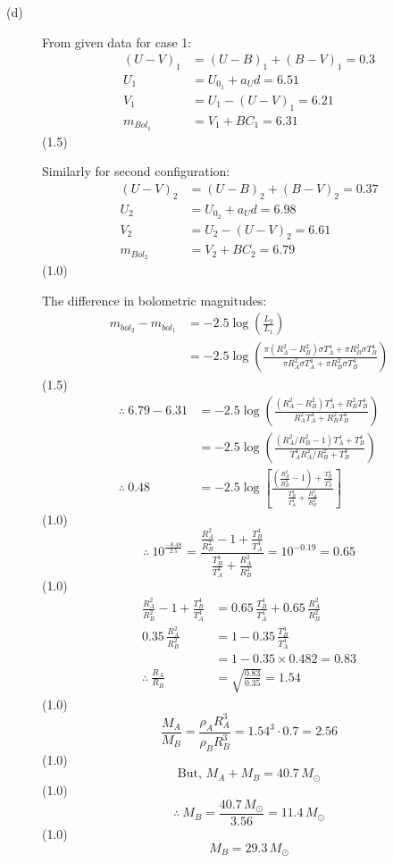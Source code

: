\begin{description}
\item[(d)] From given data for case 1:
  \begin{align*}
    (U - V)_1 &= (U - B)_1 + (B - V)_1 = 0.3 \\
    U_1 &= U_{0_1} + a_U d = 6.51 \\
    V_1 &= U_1 - (U - V)_1 = 6.21 \\
    m_{Bol_1} &= V_1 + BC_1 = 6.31
  \end{align*}
  \hfill(1.5)

  Similarly for second configuration:
  \begin{align*}
    (U - V)_2 &= (U - B)_2 + (B - V)_2 = 0.37 \\
    U_2 &= U_{0_2} + a_U d = 6.98 \\
    V_2 &= U_2 - (U - V)_2 = 6.61 \\
    m_{Bol_2} &= V_2 + BC_2 = 6.79
  \end{align*}
  \hfill(1.0)

  The difference in bolometric magnitudes:
  \begin{align*}
    m_{bol_2} - m_{bol_1}
      &= -2.5\log\left(\frac{L_2}{L_1}\right) \\
      &= -2.5\log\left(
         \frac{\pi(R_A^2 - R_B^2)\sigma T_A^4 + \pi R_B^2 \sigma T_B^4}
              {\pi R_A^2 \sigma T_A^4 + \pi R_B^2 \sigma T_B^4}\right)
  \end{align*}
  \hfill(1.5)
  \begin{align*}
    \therefore\ 6.79 - 6.31
      &= -2.5\log\left(
         \frac{(R_A^2 - R_B^2)T_A^4 + R_B^2 T_B^4}
              {R_A^2 T_A^4 + R_B^2 T_B^4}\right) \\
      &= -2.5\log\left(
         \frac{(R_A^2/R_B^2 - 1)T_A^4 + T_B^4}
              {T_A^4 R_A^2/R_B^2 + T_B^4}\right) \\
    \therefore\ 0.48
      &= -2.5\log\left[
         \frac{\left(\frac{R_A^2}{R_B^2} - 1\right) + \frac{T_B^4}{T_A^4}}
              {\frac{T_B^4}{T_A^4} + \frac{R_A^2}{R_B^2}}\right]
  \end{align*}
  \hfill(1.0)
  \[ \therefore\ 10^{\frac{-0.48}{2.5}}
     = \frac{\frac{R_A^2}{R_B^2} - 1 + \frac{T_B^4}{T_A^4}}
            {\frac{T_B^4}{T_A^4} + \frac{R_A^2}{R_B^2}}
     = 10^{-0.19} = 0.65 \]
  \hfill(1.0)
  \begin{align*}
    \frac{R_A^2}{R_B^2} - 1 + \frac{T_B^4}{T_A^4}
      &= 0.65\,\frac{T_B^4}{T_A^4} + 0.65\,\frac{R_A^2}{R_B^2} \\
    0.35\,\frac{R_A^2}{R_B^2}
      &= 1 - 0.35\,\frac{T_B^4}{T_A^4} \\
      &= 1 - 0.35 \times 0.482 = 0.83 \\
    \therefore\ \frac{R_A}{R_B}
      &= \sqrt{\frac{0.83}{0.35}} = 1.54
  \end{align*}
  \hfill(1.0)
  \[ \frac{M_A}{M_B} = \frac{\rho_A R_A^3}{\rho_B R_B^3}
     = 1.54^3 \cdot 0.7 = 2.56 \]
  \hfill(1.0)
  \[ \text{But, } M_A + M_B = 40.7\,M_\odot \]
  \hfill(1.0)
  \[ \therefore\ M_B = \frac{40.7\,M_\odot}{3.56} = 11.4\,M_\odot \]
  \hfill(1.0)
  \[ M_B = 29.3\,M_\odot \]
\end{description}

